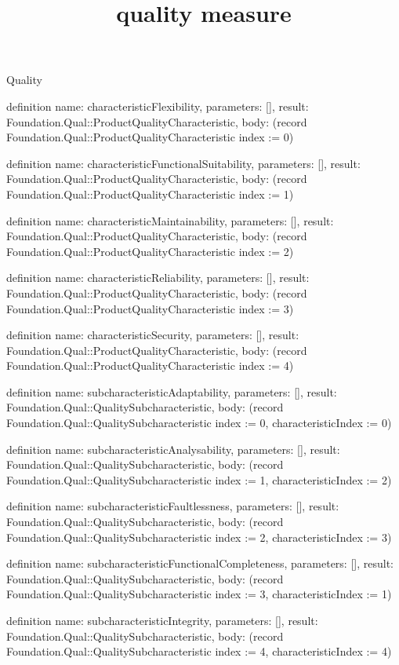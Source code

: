 \begin{lexlean}{Quality}
\title{quality measure}
\begin{semanticmodule}
definition{
  name: characteristicFlexibility,
  parameters: [],
  result: Foundation.Qual::ProductQualityCharacteristic,
  body: (record Foundation.Qual::ProductQualityCharacteristic {index := 0})
}

definition{
  name: characteristicFunctionalSuitability,
  parameters: [],
  result: Foundation.Qual::ProductQualityCharacteristic,
  body: (record Foundation.Qual::ProductQualityCharacteristic {index := 1})
}

definition{
  name: characteristicMaintainability,
  parameters: [],
  result: Foundation.Qual::ProductQualityCharacteristic,
  body: (record Foundation.Qual::ProductQualityCharacteristic {index := 2})
}

definition{
  name: characteristicReliability,
  parameters: [],
  result: Foundation.Qual::ProductQualityCharacteristic,
  body: (record Foundation.Qual::ProductQualityCharacteristic {index := 3})
}

definition{
  name: characteristicSecurity,
  parameters: [],
  result: Foundation.Qual::ProductQualityCharacteristic,
  body: (record Foundation.Qual::ProductQualityCharacteristic {index := 4})
}

definition{
  name: subcharacteristicAdaptability,
  parameters: [],
  result: Foundation.Qual::QualitySubcharacteristic,
  body: (record Foundation.Qual::QualitySubcharacteristic {index := 0, characteristicIndex := 0})
}

definition{
  name: subcharacteristicAnalysability,
  parameters: [],
  result: Foundation.Qual::QualitySubcharacteristic,
  body: (record Foundation.Qual::QualitySubcharacteristic {index := 1, characteristicIndex := 2})
}

definition{
  name: subcharacteristicFaultlessness,
  parameters: [],
  result: Foundation.Qual::QualitySubcharacteristic,
  body: (record Foundation.Qual::QualitySubcharacteristic {index := 2, characteristicIndex := 3})
}

definition{
  name: subcharacteristicFunctionalCompleteness,
  parameters: [],
  result: Foundation.Qual::QualitySubcharacteristic,
  body: (record Foundation.Qual::QualitySubcharacteristic {index := 3, characteristicIndex := 1})
}

definition{
  name: subcharacteristicIntegrity,
  parameters: [],
  result: Foundation.Qual::QualitySubcharacteristic,
  body: (record Foundation.Qual::QualitySubcharacteristic {index := 4, characteristicIndex := 4})
}


\end{semanticmodule}
\end{lexlean}
